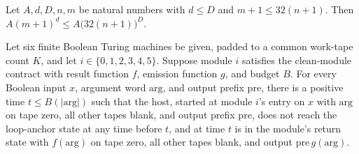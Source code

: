 \begin{lemma}
\label{Complexity.sat_request_budget}
\leanok
{}
Let $A,d,D,n,m$ be natural numbers with $d \le D$ and $m+1 \le 32(n+1)$. Then $A(m+1)^d
\le A\bigl(32(n+1)\bigr)^D$.
\end{lemma}

\begin{lemma}
\label{Complexity.satHost_clean}
\leanok
{}
Let six finite Boolean Turing machines be given, padded to a common work-tape count $K$,
and let $i\in\{0,1,2,3,4,5\}$. Suppose module $i$ satisfies the clean-module contract
with result function $f$, emission function $g$, and budget $B$. For every Boolean input
$x$, argument word $\mathrm{arg}$, and output prefix $\mathrm{pre}$, there is a positive
time $t\le B(|\mathrm{arg}|)$ such that the host, started at module $i$'s entry on $x$
with $\mathrm{arg}$ on tape zero, all other tapes blank, and output prefix
$\mathrm{pre}$, does not reach the loop-anchor state at any time before $t$, and at time
$t$ is in the module's return state with $f(\mathrm{arg})$ on tape zero, all other tapes
blank, and output $\mathrm{pre}\,g(\mathrm{arg})$.
\end{lemma}

